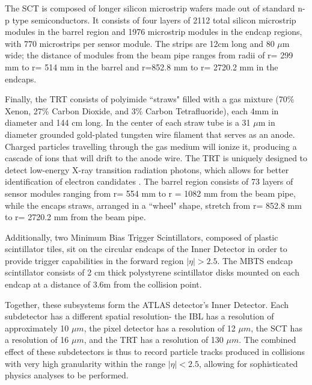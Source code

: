 The SCT is composed of longer silicon microstrip wafers made out of standard n-p type semiconductors. It consists of four layers of 2112 total silicon microstrip modules in the barrel region and 1976 microstrip modules in the endcap regions, with 770 microstrips per sensor module. The strips are 12cm long and 80 $\mu$m wide; the distance of modules from the beam pipe ranges from radii of r= 299 mm to r= 514 mm in the barrel and r=852.8 mm to r= 2720.2 mm in the endcaps.

Finally, the TRT consists of polyimide ``straws" filled with a gas mixture (70\% Xenon, 27\% Carbon Dioxide, and 3\% Carbon Tetrafluoride), each 4mm in diameter and 144 cm long. In the center of each straw tube is a 31 $\mu$m in diameter grounded gold-plated tungsten wire filament that serves as an anode. Charged particles travelling through the gas medium will ionize it, producing a cascade of ions that will drift to the anode wire. The TRT is uniquely designed to detect low-energy X-ray transition radiation photons, which allows for better identification of electron candidates \cite{TRT}. The barrel region consists of 73 layers of sensor modules ranging from r= 554 mm to r = 1082 mm from the beam pipe, while the encaps straws, arranged in a ``wheel" shape, stretch from r= 852.8 mm to r= 2720.2 mm from the beam pipe. 

Additionally, two Minimum Bias Trigger Scintillators, composed of plastic scintillator tiles, sit on the circular endcaps of the Inner Detector in order to provide trigger capabilities in the forward region $ |\eta| > 2.5 $. The MBTS endcap scintillator consists of 2 cm thick polystyrene scintillator disks mounted on each endcap at a distance of 3.6m from the collision point. 

Together, these subsystems form the ATLAS detector's Inner Detector. Each subdetector has a different spatial resolution- the IBL has a resolution of  approximately 10 $\mu m$, the pixel detector has a resolution of 12 $\mu m$, the SCT has a resolution of 16 $\mu m$, and the TRT has a resolution of 130 $\mu m$. The combined effect of these subdetectors is thus to record particle tracks produced in collisions with very high granularity within the range $ | \eta | < 2.5$, allowing for sophisticated physics analyses to be performed. 

